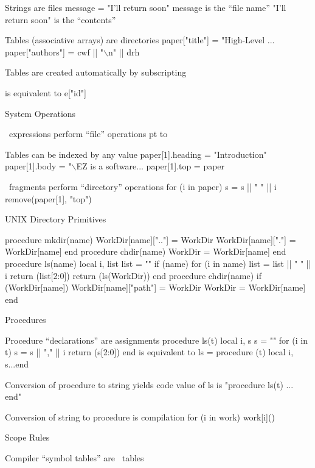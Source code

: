 \Bullet Strings are files
\program
		message = "I'll return soon"
\endprogram
\medskip
		{\pt message} is the ``file name''
		{\pt "I'll return soon"} is the ``contents''

\Bullet Tables (associative arrays) are directories
\program
		paper["title"] = "High-Level ...
		paper["authors"] = cwf || "$\backslash$n" || drh
\endprogram

\Bullet Tables are created automatically by subscripting

 is equivalent to {\pt e["id"]}
\NewPage\Longtrue
\centerline{\bigrm System Operations}
\Bullet \EZ\ expressions perform ``file'' operations
\medskip
{} pt
\halign to 

\Bullet Tables can be indexed by any value
\program
		paper[1].heading = "Introduction"
		paper[1].body = "$\backslash$EZ is a software...	
		paper[1].top = paper
\endprogram

\Bullet \EZ\ fragments perform ``directory'' operations
\program
		for (i in paper)
			s = s || " " || i
\medskip
		remove(paper[1], "top")
\endprogram
\NewPage
\centerline{\bigrm U{\rm NIX} Directory Primitives}\Longtrue
\program
procedure mkdir(name)
	WorkDir[name][".."] = WorkDir
	WorkDir[name]["."] = WorkDir[name]
end
\medskip
procedure chdir(name)
	WorkDir = WorkDir[name]
end
\medskip
procedure ls(name) local i, list
	list = ""
	if (name) {
		for (i in name)
			list = list || " " || i
		return (list[2:0])
		}
	return (ls(WorkDir))
end
\medskip
procedure chdir(name)
	if (WorkDir[name]) {
		WorkDir[name]["path"] = WorkDir
		WorkDir = WorkDir[name]
		}
end
\endprogram
\NewPage
\centerline{\bigrm Procedures}
\Bullet Procedure ``declarations'' are assignments
\program
		procedure ls(t) local i, s
			s = ""
			for (i in t)
				s = s || "," || i
			return (s[2:0])
		end
\endprogram
\medskip
		is equivalent to
\program
		ls = procedure (t) local i, s...end
\endprogram

\Bullet Conversion of procedure to string yields code
		value of {\pt ls} is {\pt "procedure ls(t) ... end"}

\Bullet Conversion of string to procedure is compilation
\program
		for (i in work)
			work[i]()
\endprogram
\NewPage
\centerline{\bigrm Scope Rules}\Longtrue
\Bullet Compiler ``symbol tables'' are \EZ\ tables

